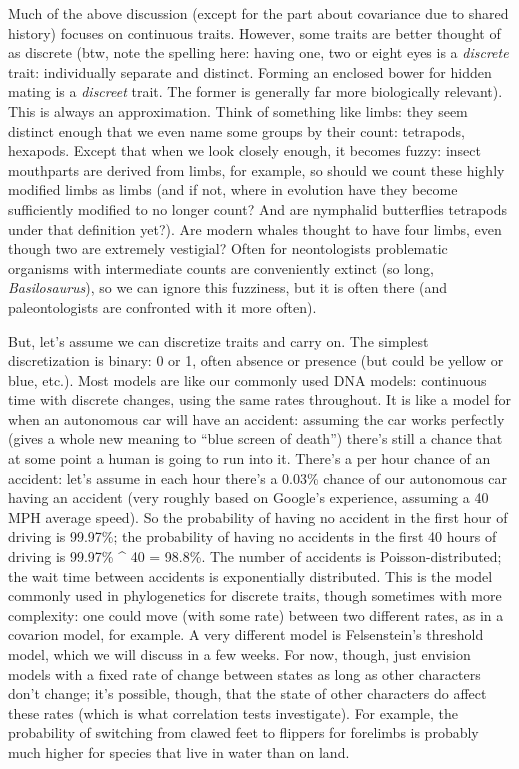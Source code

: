 \documentclass[]{book}
\theoremstyle{definition}
\theoremstyle{definition}
\theoremstyle{remark}
\begin{document}
Much of the above discussion (except for the part about covariance due
to shared history) focuses on continuous traits. However, some traits
are better thought of as discrete (btw, note the spelling here: having
one, two or eight eyes is a \emph{discrete} trait: individually separate
and distinct. Forming an enclosed bower for hidden mating is a
\emph{discreet} trait. The former is generally far more biologically
relevant). This is always an approximation. Think of something like
limbs: they seem distinct enough that we even name some groups by their
count: tetrapods, hexapods. Except that when we look closely enough, it
becomes fuzzy: insect mouthparts are derived from limbs, for example, so
should we count these highly modified limbs as limbs (and if not, where
in evolution have they become sufficiently modified to no longer count?
And are nymphalid butterflies tetrapods under that definition yet?). Are
modern whales thought to have four limbs, even though two are extremely
vestigial? Often for neontologists problematic organisms with
intermediate counts are conveniently extinct (so long,
\emph{Basilosaurus}), so we can ignore this fuzziness, but it is often
there (and paleontologists are confronted with it more often).

But, let's assume we can discretize traits and carry on. The simplest
discretization is binary: 0 or 1, often absence or presence (but could
be yellow or blue, etc.). Most models are like our commonly used DNA
models: continuous time with discrete changes, using the same rates
throughout. It is like a model for when an autonomous car will have an
accident: assuming the car works perfectly (gives a whole new meaning to
``blue screen of death'') there's still a chance that at some point a
human is going to run into it. There's a per hour chance of an accident:
let's assume in each hour there's a 0.03\% chance of our autonomous car
having an accident (very roughly based on Google's experience, assuming
a 40 MPH average speed). So the probability of having no accident in the
first hour of driving is 99.97\%; the probability of having no accidents
in the first 40 hours of driving is 99.97\% \^{} 40 = 98.8\%. The number
of accidents is Poisson-distributed; the wait time between accidents is
exponentially distributed. This is the model commonly used in
phylogenetics for discrete traits, though sometimes with more
complexity: one could move (with some rate) between two different rates,
as in a covarion model, for example. A very different model is
Felsenstein's threshold model, which we will discuss in a few weeks. For
now, though, just envision models with a fixed rate of change between
states as long as other characters don't change; it's possible, though,
that the state of other characters do affect these rates (which is what
correlation tests investigate). For example, the probability of
switching from clawed feet to flippers for forelimbs is probably much
higher for species that live in water than on land.
\end{document}
